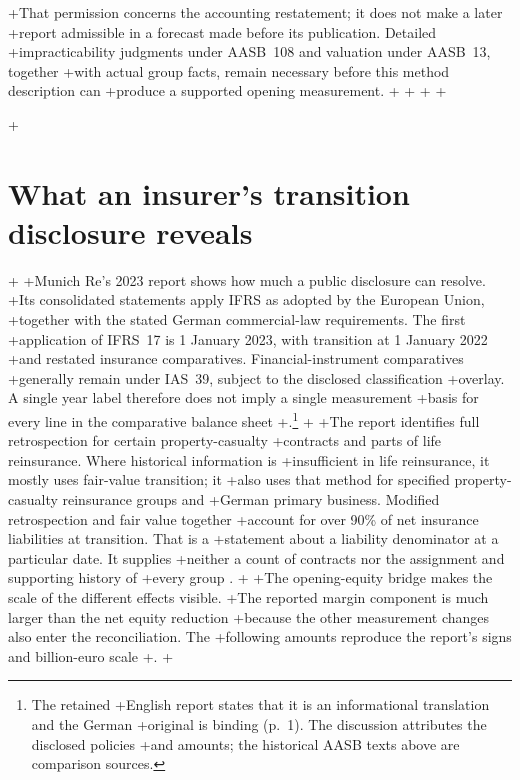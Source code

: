+That permission concerns the accounting restatement; it does not make a later
+report admissible in a forecast made before its publication. Detailed
+impracticability judgments under AASB~108 and valuation under AASB~13, together
+with actual group facts, remain necessary before this method description can
+produce a supported opening measurement.
+
+
+\clearpage
+\hypertarget{munich-re-transition-disclosure}{%
+\section{What an insurer's transition disclosure reveals}\label{method-insurance-munich-transition}}
+
+Munich Re's 2023 report shows how much a public disclosure can resolve.
+Its consolidated statements apply IFRS as adopted by the European Union,
+together with the stated German commercial-law requirements. The first
+application of IFRS~17 is 1 January 2023, with transition at 1 January 2022
+and restated insurance comparatives. Financial-instrument comparatives
+generally remain under IAS~39, subject to the disclosed classification
+overlay. A single year label therefore does not imply a single measurement
+basis for every line in the comparative balance sheet
+\citep[pp.~155 and 183--184]{munichre2023annual}.\footnote{The retained
+English report states that it is an informational translation and the German
+original is binding (p.~1). The discussion attributes the disclosed policies
+and amounts; the historical AASB texts above are comparison sources.}
+
+The report identifies full retrospection for certain property-casualty
+contracts and parts of life reinsurance. Where historical information is
+insufficient in life reinsurance, it mostly uses fair-value transition; it
+also uses that method for specified property-casualty reinsurance groups and
+German primary business. Modified retrospection and fair value together
+account for over 90\% of net insurance liabilities at transition. That is a
+statement about a liability denominator at a particular date. It supplies
+neither a count of contracts nor the assignment and supporting history of
+every group \citep[p.~183]{munichre2023annual}.
+
+The opening-equity bridge makes the scale of the different effects visible.
+The reported margin component is much larger than the net equity reduction
+because the other measurement changes also enter the reconciliation. The
+following amounts reproduce the report's signs and billion-euro scale
+\citep[p.~184]{munichre2023annual}.
+
